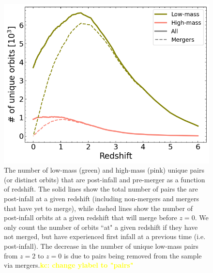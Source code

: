 \documentclass[twocolumn,linenumbers]{aastex631}
\newcommand{\kc}[1]{\textcolor{yellow}{\textbf{kc: #1}} }
\begin{document}
\begin{figure}[htb]
    \begin{center}
    \includegraphics[width=\columnwidth]{plots/bet-on-it/6_paircount.png}
    \caption{The number of low-mass (green) and high-mass (pink) unique pairs (or distinct orbits) that are post-infall and pre-merger as a function of redshift. 
    The solid lines show the total number of pairs the are post-infall at a given redshift (including non-mergers and mergers that have yet to merge), while dashed lines show the number of post-infall orbits at a given redshift that will merge before $z=0$.
    We only count the number of orbits ``at" a given redshift if they have not merged, but have experienced first infall at a previous time (i.e. post-infall). 
    The decrease in the number of unique low-mass pairs from $z=2$ to $z=0$ is due to pairs being removed from the sample via mergers.\kc{change ylabel to "pairs"}
    }
    \label{fig:numorbits}
    \end{center}
\end{figure}
\end{document}
